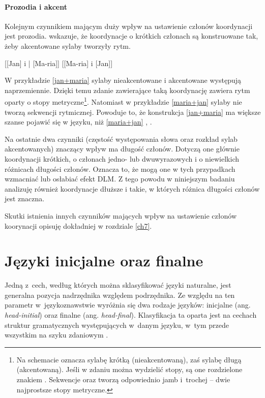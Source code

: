 \paragraph{Prozodia i akcent}

Kolejnym czynnikiem mającym duży wpływ na ustawienie członów koordynacji jest prozodia. \cite{lohmann2014english} wskazuje, że koordynacje o krótkich członach są konstruowane tak, żeby akcentowane sylaby tworzyły rytm.

\begin{exe}
\ex \label{jan+maria} {
        {[[Jan] i | [Ma-ria]]}
}
\ex \label{maria+jan} {
        {[[Ma-ria] i [Jan]]}}
\end{exe}

W przykładzie \eqref{jan+maria} sylaby nieakcentowane i akcentowane występują naprzemiennie. Dzięki temu zdanie zawierające taką koordynację zawiera rytm oparty o stopy metryczne\footnote{
Na schemacie  oznacza sylabę krótką (nieakcentowaną), zaś \metricsymbols{_} sylabę długą (akcentowaną). Jeśli w zdaniu można wydzielić stopy, są one rozdzielone znakiem \metricsymbols{|}.  Sekwencje  oraz  tworzą odpowiednio jamb i~trochej -- dwie najprostsze stopy metryczne.}.
Natomiast w przykładzie \eqref{maria+jan} sylaby nie tworzą sekwencji rytmicznej. Powoduje to, że konstrukcja \eqref{jan+maria} ma większe szanse pojawić się w języku, niż \eqref{maria+jan} \citep{mcdonald1993word}, \citealt{wright2005ladies}.

Na ostatnie dwa czynniki (częstość występowania słowa oraz rozkład sylab akcentowanych) znaczący wpływ ma długość członów. Dotyczą one głównie koordynacji krótkich, o członach jedno- lub dwuwyrazowych i o niewielkich różnicach długości członów. Oznacza to, że mogą one w tych przypadkach wzmacniać lub osłabiać efekt DLM. Z tego powodu w niniejszym badaniu analizuję również koordynacje dłuższe i takie, w których różnica długości członów jest znaczna.

Skutki istnienia innych czynników mających wpływ na ustawienie członów koorynacji opisuję dokładniej w rozdziale \ref{ch7}. 

\section{Języki inicjalne oraz finalne}

Jedną z~cech, według których można sklasyfikować języki naturalne, jest generalna pozycja nadrzędnika względem podrzędnika. Ze względu na ten parametr w~językoznawstwie wyróżnia się dwa rodzaje języków: inicjalne (ang. \emph{head-initial}) oraz finalne (ang. \emph{head-final}). Klasyfikacja ta oparta jest na cechach struktur gramatycznych występujących w~danym języku, w~tym przede wszystkim na szyku zdaniowym \citep{polinsky2020headedness}.

